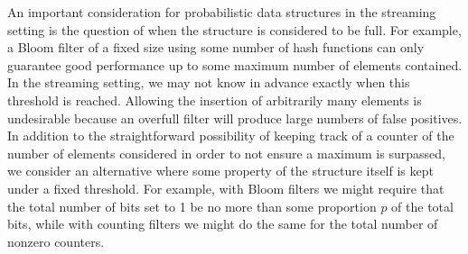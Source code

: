 An important consideration for probabilistic data structures in the streaming setting is the question of when the structure is considered to be full. For example, a Bloom filter of a fixed size using some number of hash functions can only guarantee good performance up to some maximum number of elements contained. In the streaming setting, we may not know in advance exactly when this threshold is reached. Allowing the insertion of arbitrarily many elements is undesirable because an overfull filter will produce large numbers of false positives. In addition to the straightforward possibility of keeping track of a counter of the number of elements considered in order to not ensure a maximum is surpassed, we consider an alternative where some property of the structure itself is kept under a fixed threshold. For example, with Bloom filters we might require that the total number of bits set to 1 be no more than some proportion $p$ of the total bits, while with counting filters we might do the same for the total number of nonzero counters. 